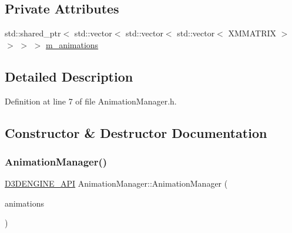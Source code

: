 \subsection*{Private Attributes}
\begin{DoxyCompactItemize}
\item 
std\+::shared\+\_\+ptr$<$ std\+::vector$<$ std\+::vector$<$ std\+::vector$<$ X\+M\+M\+A\+T\+R\+IX $>$ $>$ $>$ $>$ \mbox{\hyperlink{class_animation_manager_a30d55ef88d1fcea24ba39a254a84b56a}{m\+\_\+animations}}
\end{DoxyCompactItemize}


\subsection{Detailed Description}


Definition at line 7 of file Animation\+Manager.\+h.



\subsection{Constructor \& Destructor Documentation}
\mbox{\label{class_animation_manager_ae635935a07faf7523ac765e90720befd}} 
\subsubsection{\texorpdfstring{Animation\+Manager()}{AnimationManager()}\hspace{0.1cm}{\footnotesize\ttfamily [1/2]}}
{\footnotesize\ttfamily \mbox{\hyperlink{stdafx_8h_a8ee2d990c5dfba7794dd2b60741d7722}{D3\+D\+E\+N\+G\+I\+N\+E\+\_\+\+A\+PI}} Animation\+Manager\+::\+Animation\+Manager (\begin{DoxyParamCaption}\item[{std\+::vector$<$ std\+::vector$<$ std\+::vector$<$ X\+M\+M\+A\+T\+R\+IX $>$$>$$>$}]{animations }\end{DoxyParamCaption})}

\mbox{\label{class_animation_manager_ad4c2c66a364c768d0626f60e7e0c0be0}} 
